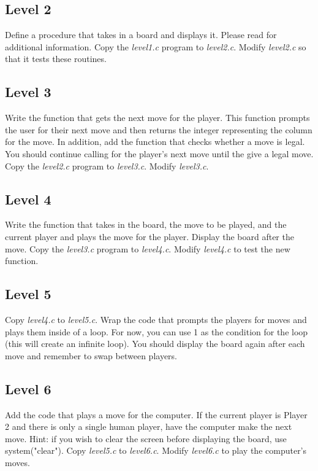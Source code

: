 \documentclass{article}
\begin{document}
\subsection*{Level 2}
Define a procedure that takes in a board and displays it.
Please read  for additional
information.
Copy the {\it level1.c} program to {\it level2.c}.
Modify {\it level2.c} so that it tests these routines.

\subsection*{Level 3}
Write the function that gets the next move for the player. This function prompts the user for their next move and then returns the integer representing the column for the move. In addition, add the function that checks whether a move is legal. You should continue calling for the player's next move until the give a legal move. 
Copy the {\it level2.c} program to {\it level3.c}.
Modify {\it level3.c}.

\subsection*{Level 4}
Write the function that takes in the board, the move to be played, and the current player and plays the move for the player. Display the board after the move. 
Copy the {\it level3.c} program to {\it level4.c}.
Modify {\it level4.c} to test the new function.

\subsection*{Level 5}
Copy {\it level4.c} to {\it level5.c}.
Wrap the code that prompts the players for moves and plays them inside of a loop. For now, you can use 1 as the condition for the loop (this will create an infinite loop). You should display the board again after each move and remember to swap between players.

\subsection*{Level 6}
Add the code that plays a move for the computer. If the current player is Player 2 and there is only a single human player, have the computer make the next move. Hint: if you wish to clear the screen before displaying the board, use system("clear").
Copy {\it level5.c} to {\it level6.c}.
Modify {\it level6.c} to play the computer's moves.
\end{document}
